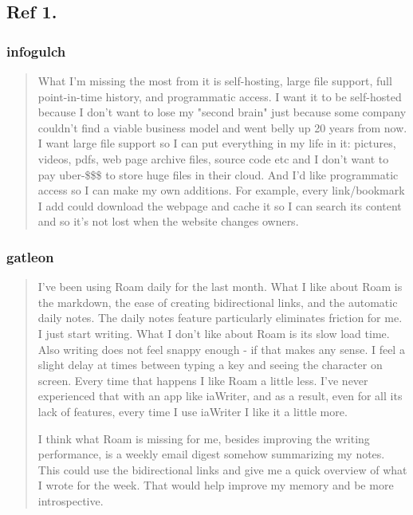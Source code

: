 \documentclass[11pt]{article}
\begin{document}
\subsection{Ref 1.}
\label{sec:orgd911fe5}
\subsubsection{infogulch}
\label{sec:org0e5491d}
\begin{quote}
What I'm missing the most from it is self-hosting, large file support, full point-in-time history, and programmatic access. I want it to be self-hosted because I don't want to lose my "second brain" just because some company couldn't find a viable business model and went belly up 20 years from now. I want large file support so I can put everything in my life in it: pictures, videos, pdfs, web page archive files, source code etc and I don't want to pay uber-\$\$\$ to store huge files in their cloud. And I'd like programmatic access so I can make my own additions. For example, every link/bookmark I add could download the webpage and cache it so I can search its content and so it's not lost when the website changes owners.
\end{quote}

\subsubsection{gatleon}
\label{sec:org054d7fa}
\begin{quote}
I've been using Roam daily for the last month. What I like about Roam is the markdown, the ease of creating bidirectional links, and the automatic daily notes. The daily notes feature particularly eliminates friction for me. I just start writing.
What I don't like about Roam is its slow load time. Also writing does not feel snappy enough - if that makes any sense. I feel a slight delay at times between typing a key and seeing the character on screen. Every time that happens I like Roam a little less. I've never experienced that with an app like iaWriter, and as a result, even for all its lack of features, every time I use iaWriter I like it a little more.

I think what Roam is missing for me, besides improving the writing performance, is a weekly email digest somehow summarizing my notes. This could use the bidirectional links and give me a quick overview of what I wrote for the week. That would help improve my memory and be more introspective.
\end{quote}
\end{document}
